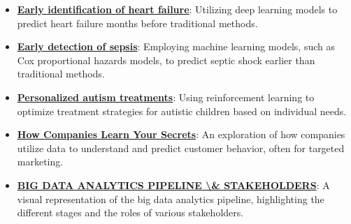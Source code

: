 \documentclass{article}%
\begin{document}
\begin{itemize}[leftmargin=*]
\item \href{https://purdue.brightspace.com/d2l/common/assets/pdfjs-d2l-dist/1.0.14-legacy/web/viewer.html?file=\%2Fcontent\%2Fenforced\%2F1095465-WL.202510.CS24200.LE1\%2F02L1-datas-intro.pdf\%3Fou\%3D1095465\&lang=en-us\&container=d2l-fileviewer-rendered-pdf\&fullscreen=d2l-fileviewer-rendered-pdf-dialog\&height=667#page=17}{\textbf{Early identification of heart failure}}: Utilizing deep learning models to predict heart failure months before traditional methods.%
\item \href{https://purdue.brightspace.com/d2l/common/assets/pdfjs-d2l-dist/1.0.14-legacy/web/viewer.html?file=\%2Fcontent\%2Fenforced\%2F1095465-WL.202510.CS24200.LE1\%2F02L1-datas-intro.pdf\%3Fou\%3D1095465\&lang=en-us\&container=d2l-fileviewer-rendered-pdf\&fullscreen=d2l-fileviewer-rendered-pdf-dialog\&height=667#page=19}{\textbf{Early detection of sepsis}}: Employing machine learning models, such as Cox proportional hazards models, to predict septic shock earlier than traditional methods.%
\item \href{https://purdue.brightspace.com/d2l/common/assets/pdfjs-d2l-dist/1.0.14-legacy/web/viewer.html?file=\%2Fcontent\%2Fenforced\%2F1095465-WL.202510.CS24200.LE1\%2F02L1-datas-intro.pdf\%3Fou\%3D1095465\&lang=en-us\&container=d2l-fileviewer-rendered-pdf\&fullscreen=d2l-fileviewer-rendered-pdf-dialog\&height=667#page=20}{\textbf{Personalized autism treatments}}: Using reinforcement learning to optimize treatment strategies for autistic children based on individual needs.%
\item \href{https://purdue.brightspace.com/d2l/common/assets/pdfjs-d2l-dist/1.0.14-legacy/web/viewer.html?file=\%2Fcontent\%2Fenforced\%2F1095465-WL.202510.CS24200.LE1\%2F02L1-datas-intro.pdf\%3Fou\%3D1095465\&lang=en-us\&container=d2l-fileviewer-rendered-pdf\&fullscreen=d2l-fileviewer-rendered-pdf-dialog\&height=667#page=21}{\textbf{How Companies Learn Your Secrets}}: An exploration of how companies utilize data to understand and predict customer behavior, often for targeted marketing.%
\item \href{https://purdue.brightspace.com/d2l/common/assets/pdfjs-d2l-dist/1.0.14-legacy/web/viewer.html?file=\%2Fcontent\%2Fenforced\%2F1095465-WL.202510.CS24200.LE1\%2F02L1-datas-intro.pdf\%3Fou\%3D1095465\&lang=en-us\&container=d2l-fileviewer-rendered-pdf\&fullscreen=d2l-fileviewer-rendered-pdf-dialog\&height=667#page=24}{\textbf{BIG DATA ANALYTICS PIPELINE \textbackslash{}\& STAKEHOLDERS}}: A visual representation of the big data analytics pipeline, highlighting the different stages and the roles of various stakeholders.%

\end{itemize}
\end{document}
